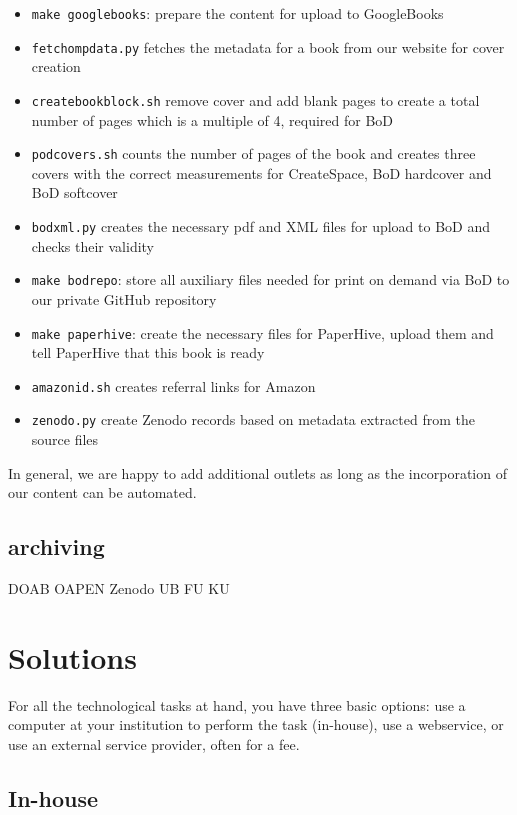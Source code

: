 \documentclass[guidelines,nonflat,modfonts] {langsci/langscibook}
\begin{document}
\begin{itemize}
 \item \texttt{make googlebooks}: prepare the content for upload to GoogleBooks 
 \item \texttt{fetchompdata.py} fetches the metadata for a book from our website for cover creation 
 \item \texttt{createbookblock.sh} remove cover and add blank pages to create a total number of pages which is a multiple of 4, required for BoD
 \item \texttt{podcovers.sh} counts the number of pages of the book and creates three covers with the correct measurements for CreateSpace, BoD hardcover and BoD softcover 
 \item \texttt{bodxml.py} creates the necessary pdf and XML files for upload to BoD and checks their validity
 \item \texttt{make bodrepo}: store all auxiliary files needed for print on demand via BoD to our private GitHub repository
 \item \texttt{make paperhive}: create the necessary files for PaperHive, upload them and tell PaperHive that this book is ready 
 \item \texttt{amazonid.sh} creates referral links for Amazon
 \item \texttt{zenodo.py} create Zenodo records based on metadata extracted from the source files 
\end{itemize}
 
In general, we are happy to add additional outlets as long as the incorporation of our content can be automated.  
 
   


\subsection{archiving}
                    DOAB
                    OAPEN
                    Zenodo
                    UB FU
                    KU %

\section{Solutions}
For all the technological tasks at hand, you have three basic options: use a computer at your institution to perform the task (in-house), use a webservice, or use an external service provider, often for a fee. 

\subsection{In-house}
\end{document}
